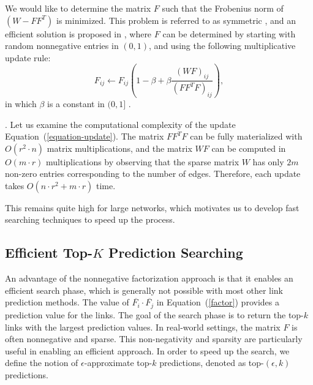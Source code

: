 We would like to determine the matrix $F$ such that the Frobenius
norm of $( W - F F^T)$ is minimized.  This problem is referred to as
symmetric \NMF, and an efficient solution is proposed in
\cite{long}, where $F$ can be determined by starting with random
nonnegative entries in $(0, 1)$, and using the following
multiplicative update rule:
\begin{equation}
\label{equation-update}
F_{ij} \leftarrow F_{ij} ( 1 - \beta + \beta \frac{(W F)_{ij} }{(F F^T F)_{ij}} ),
\end{equation}
in which $\beta$ is a constant in $( 0, 1]$ \cite{ding}.

. Let us examine the computational complexity of
the update Equation~(\ref{equation-update}).
The matrix $F F^T F$  can be fully materialized  with
$O(r^2 \cdot n)$ matrix multiplications, and the matrix $W F$ can be
computed in $O(m \cdot r)$ multiplications  by observing that the
sparse matrix $W$ has only $2m$ non-zero entries corresponding to the
number of edges. Therefore, each update takes $O(n
\cdot r^2 +m\cdot r )$ time.

This remains quite high for large networks, which motivates us to develop fast searching techniques to speed up the process.


\subsection{Efficient Top-$K$ Prediction Searching}
\label{sec-NMF-topk}

An advantage of the nonnegative factorization approach is that it
enables an efficient search phase, which is generally not possible
with most other link prediction methods. The value of
$\overline{F_i} \cdot \overline{F_j}$ in Equation~(\ref{factor}) provides a prediction value
for the links. The goal of the search phase is to return the top-$k$
links with the largest prediction values. In real-world settings, the matrix $F$ is
often nonnegative and sparse. This non-negativity and sparsity are
particularly useful in enabling an efficient approach. In order to
speed up the search, we define the notion of $\epsilon$-approximate
top-$k$ predictions, denoted as top-$(\epsilon, k)$ predictions.


